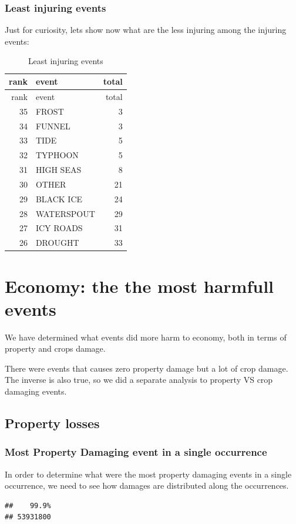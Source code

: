 \documentclass[]{article}
\begin{document}
\subsubsection{Least injuring events}\label{least-injuring-events}

Just for curiosity, lets show now what are the less injuring among the
injuring events:

\begin{longtable}[]{@{}rlr@{}}
\caption{Least injuring events}\tabularnewline
\toprule
rank & event & total\tabularnewline
\midrule
\endfirsthead
\toprule
rank & event & total\tabularnewline
\midrule
\endhead
35 & FROST & 3\tabularnewline
34 & FUNNEL & 3\tabularnewline
33 & TIDE & 5\tabularnewline
32 & TYPHOON & 5\tabularnewline
31 & HIGH SEAS & 8\tabularnewline
30 & OTHER & 21\tabularnewline
29 & BLACK ICE & 24\tabularnewline
28 & WATERSPOUT & 29\tabularnewline
27 & ICY ROADS & 31\tabularnewline
26 & DROUGHT & 33\tabularnewline
\bottomrule
\end{longtable}

\section{Economy: the the most harmfull
events}\label{economy-the-the-most-harmfull-events}

We have determined what events did more harm to economy, both in terms
of property and crops damage.

There were events that causes zero property damage but a lot of crop
damage. The inverse is also true, so we did a separate analysis to
property VS crop damaging events.

\subsection{Property losses}\label{property-losses}

\subsubsection{Most Property Damaging event in a single
occurrence}\label{most-property-damaging-event-in-a-single-occurrence}

In order to determine what were the most property damaging events in a
single occurrence, we need to see how damages are distributed along the
occurrences.

\begin{verbatim}
##    99.9% 
## 53931800
\end{verbatim}
\end{document}
